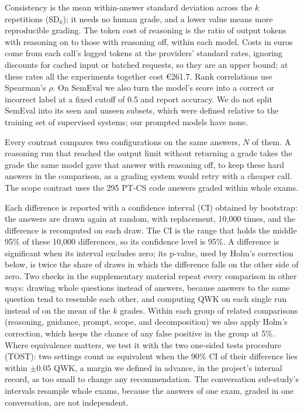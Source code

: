 Consistency is the mean within-answer standard deviation across the $k$ repetitions (SD$_k$); it needs no human
grade, and a lower value means more reproducible grading. The token cost of reasoning is the ratio of output
tokens with reasoning on to those with reasoning off, within each model. Costs in euros come from each call's
logged tokens at the providers' standard rates, ignoring discounts for cached input or batched requests, so they
are an upper bound; at these rates all the experiments together cost \euro{}261.7. Rank correlations use
Spearman's $\rho$. On SemEval we also turn the model's score into a correct or incorrect label at a fixed cutoff
of 0.5 and report accuracy. We do not split SemEval into its seen and unseen subsets, which were defined relative
to the training set of supervised systems; our prompted models have none.

Every contrast compares two configurations on the same answers, $N$ of them. A reasoning run that reached the
output limit without returning a grade takes the grade the same model gave that answer with reasoning off, to
keep these hard answers in the comparison, as a grading system would retry with a cheaper call. The scope
contrast uses the 295 PT-CS code answers graded within whole exams.

Each difference is reported with a confidence interval (CI) obtained by bootstrap: the answers are drawn again at
random, with replacement, 10,000 times, and the difference is recomputed on each draw. The CI is the range that
holds the middle 95\% of these 10,000 differences, so its confidence level is 95\%. A difference is significant when its interval excludes zero; its p-value,
used by Holm's correction below, is twice the share of draws in which the difference falls on the other side of
zero. Two checks in the supplementary material repeat every comparison in other ways: drawing whole questions
instead of answers, because answers to the same question tend to resemble each other, and computing QWK on each
single run instead of on the mean of the $k$ grades. Within each group of
related comparisons (reasoning, guidance, prompt, scope, and decomposition) we also apply Holm's correction, which
keeps the chance of any false positive in the group at 5\%. Where equivalence matters, we test it with the two
one-sided tests procedure (TOST): two settings count as equivalent when the 90\% CI of their difference lies
within $\pm0.05$ QWK, a margin we defined in advance, in the project's internal record, as too small to change any
recommendation. The conversation sub-study's intervals resample
whole exams, because the answers of one exam, graded in one conversation, are not independent.

